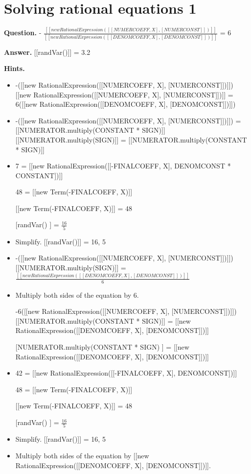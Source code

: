\documentclass{article}
\begin{document}
\section*{Solving rational equations 1}
\textbf{Question.} -
                    $\frac{[[new RationalExpression([[NUMERCOEFF, X], [NUMERCONST]])]]}{[[new RationalExpression([[DENOMCOEFF, X], [DENOMCONST]])]]}$ = 6

\textbf{Answer.} [[randVar()]] = 3.2

\textbf{Hints.}
\begin{itemize}
  \item -([[new RationalExpression([[NUMERCOEFF, X], [NUMERCONST]])]])
                            [[new RationalExpression([[NUMERCOEFF, X], [NUMERCONST]])]]
                            = 6([[new RationalExpression([[DENOMCOEFF, X], [DENOMCONST]])]])
  \item -([[new RationalExpression([[NUMERCOEFF, X], [NUMERCONST]])]]) = [[NUMERATOR.multiply(CONSTANT * SIGN)]]
                        [[NUMERATOR.multiply(SIGN)]] = [[NUMERATOR.multiply(CONSTANT * SIGN)]]
  \item 7 = [[new RationalExpression([[-FINALCOEFF, X], DENOMCONST * CONSTANT])]]
                        
                            48 = [[new Term(-FINALCOEFF, X)]]
                        
                        [[new Term(-FINALCOEFF, X)]] = 48
  \item [[randVar()]] = $\frac{16}{5}$
  \item Simplify.
                        [[randVar()]] = 16, 5
  \item -([[new RationalExpression([[NUMERCOEFF, X], [NUMERCONST]])]])
                        [[NUMERATOR.multiply(SIGN)]]
                        = $\frac{[[new RationalExpression([[DENOMCOEFF, X], [DENOMCONST]])]]}{6}$
  \item Multiply both sides of the equation by 6.
                        
                            -6([[new RationalExpression([[NUMERCOEFF, X], [NUMERCONST]])]])
                            [[NUMERATOR.multiply(CONSTANT * SIGN)]]
                            = [[new RationalExpression([[DENOMCOEFF, X], [DENOMCONST]])]]
  \item [[NUMERATOR.multiply(CONSTANT * SIGN)]] = [[new RationalExpression([[DENOMCOEFF, X], [DENOMCONST]])]]
  \item 42 = [[new RationalExpression([[-FINALCOEFF, X], DENOMCONST])]]
                        
                            48 = [[new Term(-FINALCOEFF, X)]]
                        
                        [[new Term(-FINALCOEFF, X)]] = 48
  \item [[randVar()]] = $\frac{16}{5}$
  \item Simplify.
                        [[randVar()]] = 16, 5
  \item Multiply both sides of the equation by [[new RationalExpression([[DENOMCOEFF, X], [DENOMCONST]])]].
\end{itemize}
\end{document}
